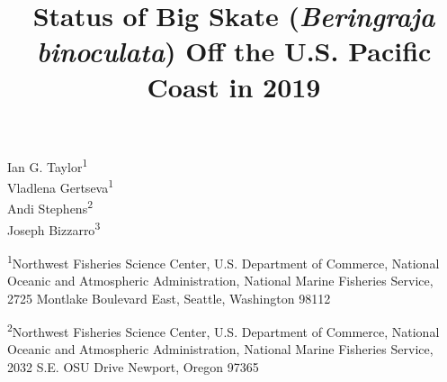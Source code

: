 \documentclass[12pt,]{article}
\title{Status of Big Skate (\emph{Beringraja binoculata}) Off the U.S. Pacific
Coast in 2019}
\author{}
\date{}
\begin{document}
\maketitle


\begin{center}
\thispagestyle{empty}

\vspace{.7cm}


\vspace{.5cm}

Ian G. Taylor\textsuperscript{1}\\
Vladlena Gertseva\textsuperscript{1}\\
Andi Stephens\textsuperscript{2}\\
Joseph Bizzarro\textsuperscript{3}\\

\vspace{.7cm}

\small

\textsuperscript{1}Northwest Fisheries Science Center, U.S. Department of Commerce, National Oceanic and Atmospheric Administration, National Marine Fisheries Service, 2725 Montlake Boulevard East, Seattle, Washington 98112\\

\vspace{.3cm}

\textsuperscript{2}Northwest Fisheries Science Center, U.S. Department of Commerce, National Oceanic and Atmospheric Administration, National Marine Fisheries Service, 2032 S.E. OSU Drive Newport, Oregon 97365


\end{center}
\end{document}
